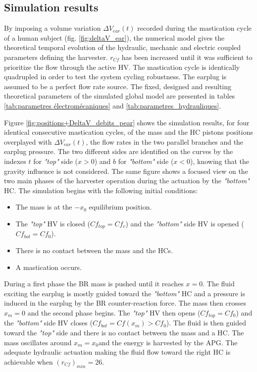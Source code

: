 \documentclass[3p,twocolumn,preprint]{elsarticle}
\begin{document}
	\subsection{Simulation results}	
	\label{subsec:Simulation results}
By imposing a volume variation $\Delta V_{ear}(t)$ recorded during the mastication cycle of a human subject (fig. \ref{fig:deltaV_ear}), the numerical model gives the theoretical temporal evolution of the hydraulic, mechanic and electric coupled parameters defining the harvester. $r_{Cf}$ has been increased until it was sufficient to prioritize the flow through the active HV. The mastication cycle is identically quadrupled in order to test the system cycling robustness. The earplug is assumed to be a perfect flow rate source. The fixed, designed and resulting theoretical parameters of the simulated global model are presented in tables \ref{tab:parametres électromécaniques} and \ref{tab:parametres_hydrauliques}.

Figure \ref{fig:positions+DeltaV_debits_pear} shows the simulation results, for four identical consecutive mastication cycles, of the mass and the HC pistons positions overplayed with $\Delta V_{ear}(t)$, the flow rates in the two parallel branches and the earplug pressure. The two different sides are identified on the curves by the indexes $t$ for \emph{"top"} side ($x>0$) and $b$ for \emph{"bottom"} side ($x<0$), knowing that the gravity influence is not considered. The same figure shows a focused view on the two main phases of the harvester operation during the actuation by the \emph{"bottom"} HC. The simulation begins with the following initial conditions:
\begin{itemize}
	\item The mass is at the $-x_0$ equilibrium position.
	\item The \emph{"top"} HV is closed ($Cf_{top} = Cf_c$) and the \emph{"bottom"} side HV is opened ($Cf_{bot} = Cf_0$).
	\item There is no contact between the mass and the HCs.
	\item A mastication occurs.
\end{itemize}

During a first phase the BR mass is pushed until it reaches $x=0$. The fluid exciting the earplug is mostly guided toward the \emph{"bottom"} HC and a pressure is induced in the earplug by the BR counter-reaction force. The mass then crosses $x_m=0$ and the second phase begins. The \emph{"top"} HV then opens ($Cf_{top} = Cf_0$) and the \emph{"bottom"} side HV closes ($Cf_{bot} = Cf(x_m)>Cf_0$). The fluid is then guided toward the \emph{"top"} side and there is no contact between the mass and a HC. The mass oscillates around $x_m=x_0$and the energy is harvested by the APG. The adequate hydraulic actuation making the fluid flow toward the right HC is achievable when \mbox{$(r_{Cf})_{min}=26$}. 
\end{document}
